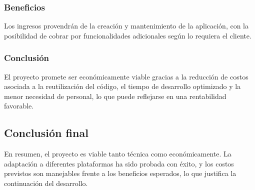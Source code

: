 \subsubsection{Beneficios}
\label{subsubsec:analisis_estudio_viabilidad_economica_beneficios}

Los ingresos provendrán de la creación y mantenimiento de la aplicación, con la posibilidad de cobrar por 
funcionalidades adicionales según lo requiera el cliente.

\subsubsection{Conclusión}
\label{subsubsec:analisis_estudio_viabilidad_economica_conclusion}

El proyecto promete ser económicamente viable gracias a la reducción de costos asociada a la reutilización 
del código, el tiempo de desarrollo optimizado y la menor necesidad de personal, lo que puede reflejarse en 
una rentabilidad favorable.

\subsection{Conclusión final}   
\label{subsec:analisis_estudio_viabilidad_conclusion}

En resumen, el proyecto es viable tanto técnica como económicamente. La adaptación a diferentes plataformas 
ha sido probada con éxito, y los costos previstos son manejables frente a los beneficios esperados, lo que 
justifica la continuación del desarrollo.
